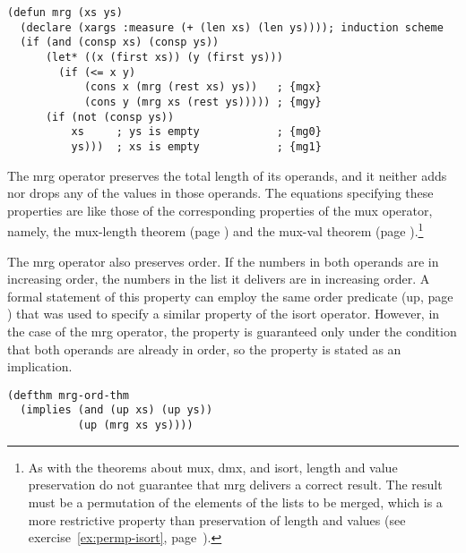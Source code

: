 \label{defun:mrg}
\begin{code}
\begin{verbatim}
(defun mrg (xs ys)
  (declare (xargs :measure (+ (len xs) (len ys)))); induction scheme
  (if (and (consp xs) (consp ys))
      (let* ((x (first xs)) (y (first ys)))
        (if (<= x y)
            (cons x (mrg (rest xs) ys))   ; {mgx}
            (cons y (mrg xs (rest ys))))) ; {mgy}
      (if (not (consp ys))
          xs     ; ys is empty            ; {mg0}
          ys)))  ; xs is empty            ; {mg1}
\end{verbatim}
\end{code}

The \textsf{mrg} operator preserves the total length of its operands,
and it neither adds nor drops any of the values in those operands.
The equations specifying these properties are like those of the
corresponding properties of the \textsf{mux} operator, namely,
the mux-length theorem (page \pageref{mux-length-thm}) and the
mux-val theorem (page \pageref{thm:mux-val}).\footnote{As
with the theorems about
\textsf{mux}, \textsf{dmx}, and \textsf{isort}, length and value preservation
do not guarantee that \textsf{mrg} delivers a correct result.
The result must be a permutation
of the elements of the lists to be merged,
which is a more restrictive property than
preservation of length and values
(see exercise~\ref{ex:permp-isort}, page~\pageref{ex:permp-isort}).}

The \textsf{mrg} operator also preserves order.
If the numbers in both operands are in increasing order,
the numbers in the list it delivers are in increasing order.
A formal statement of this property can employ the same order predicate
(\textsf{up}, page \pageref{defun:up}) that was used to specify a
similar property of the \textsf{isort} operator.
However, in the case of the \textsf{mrg} operator,
the property is guaranteed only under the condition
that both operands are already in order,
so the property is stated as an implication.
\label{defthm:mrg-ord}
\begin{code}
\begin{verbatim}
(defthm mrg-ord-thm
  (implies (and (up xs) (up ys))
           (up (mrg xs ys))))
\end{verbatim}
\end{code}

